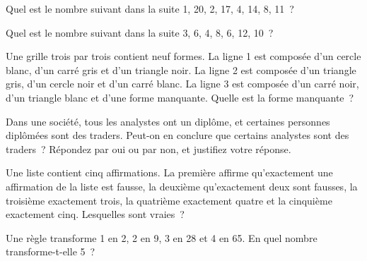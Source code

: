 \begin{question}\label{iq:iv1:sequences-patterns-and-aptitude:6}
Quel est le nombre suivant dans la suite 1, 20, 2, 17, 4, 14, 8, 11~?
\end{question}

\begin{question}\label{iq:iv1:sequences-patterns-and-aptitude:7}
Quel est le nombre suivant dans la suite 3, 6, 4, 8, 6, 12, 10~?
\end{question}

\begin{question}\label{iq:iv1:sequences-patterns-and-aptitude:8}
Une grille trois par trois contient neuf formes. La ligne 1 est composée d'un cercle blanc, d'un carré gris et d'un triangle noir. La ligne 2 est composée d'un triangle gris, d'un cercle noir et d'un carré blanc. La ligne 3 est composée d'un carré noir, d'un triangle blanc et d'une forme manquante. Quelle est la forme manquante~?
\end{question}

\begin{question}\label{iq:iv1:sequences-patterns-and-aptitude:9}
Dans une société, tous les analystes ont un diplôme, et certaines personnes diplômées sont des traders. Peut-on en conclure que certains analystes sont des traders~? Répondez par oui ou par non, et justifiez votre réponse.
\end{question}

\begin{question}\label{iq:iv1:sequences-patterns-and-aptitude:10}
Une liste contient cinq affirmations. La première affirme qu'exactement une affirmation de la liste est fausse, la deuxième qu'exactement deux sont fausses, la troisième exactement trois, la quatrième exactement quatre et la cinquième exactement cinq. Lesquelles sont vraies~?
\end{question}

\begin{question}\label{iq:iv1:sequences-patterns-and-aptitude:11}
Une règle transforme 1 en 2, 2 en 9, 3 en 28 et 4 en 65. En quel nombre transforme-t-elle 5~?
\end{question}

